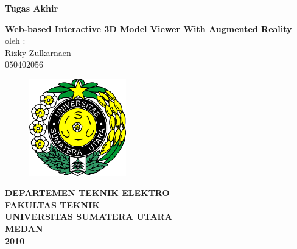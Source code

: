 \documentclass[12pt,a4paper,pdftex,final,oneside,titlepage]{book}
\begin{document}
  

\pagestyle{empty} 
	\begin{titlepage} 
		\begin{center} 
		{\Large\textbf{Tugas Akhir}}\\
		\par
		\vspace{2cm}
		\textbf{\Large Web-based Interactive 3D Model Viewer With Augmented Reality} %
		\vspace{0.5cm} \\
		oleh :\\[0.4cm] 
		{\large\underline{Rizky Zulkarnaen}}\\%
		$050402056$ \\%
		\end{center}
		
		\par
		\vfill
		
		\begin{figure}[h]
			\begin{center}
				\includegraphics[width=4.2cm]{./images/logoUSU} %
			\end{center}
        \end{figure}
        
        \vfill 
        
      \begin{center}
      {\bf \large DEPARTEMEN TEKNIK ELEKTRO}\\[0.4cm] 
      {\bf \large FAKULTAS TEKNIK}\\[0.4cm] 
      {\bf \large UNIVERSITAS SUMATERA UTARA}\\[0.4cm] 
      {\bf \large MEDAN}\\[0.4cm] 
      {\bf \large 2010}
      \end{center}
      
   \end{titlepage} 
\end{document}
